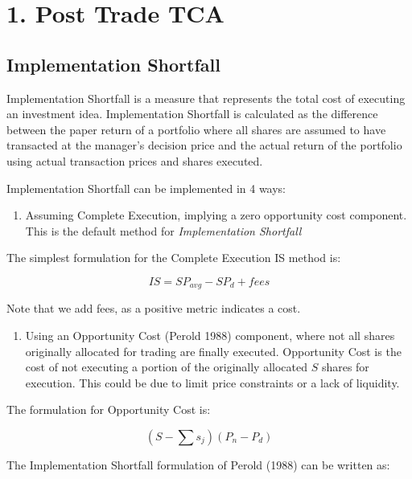 \hypertarget{post-trade-tca}{%
\section{1. Post Trade TCA}\label{post-trade-tca}}

\hypertarget{implementation-shortfall}{%
\subsection{Implementation Shortfall}\label{implementation-shortfall}}

Implementation Shortfall is a measure that represents the total cost of
executing an investment idea. Implementation Shortfall is calculated as
the difference between the paper return of a portfolio where all shares
are assumed to have transacted at the manager's decision price and the
actual return of the portfolio using actual transaction prices and
shares executed.

Implementation Shortfall can be implemented in 4 ways:

\begin{enumerate}
\def\labelenumi{\arabic{enumi}.}
\tightlist
\item
  Assuming Complete Execution, implying a zero opportunity cost
  component. This is the default method for
  \emph{Implementation Shortfall}
\end{enumerate}

The simplest formulation for the Complete Execution IS method is:

\[ IS = S P_{avg} - S P_{d} + fees \]

Note that we add fees, as a positive metric indicates a cost.

\begin{enumerate}
\def\labelenumi{\arabic{enumi}.}
\setcounter{enumi}{1}
\tightlist
\item
  Using an Opportunity Cost (Perold 1988) component, where not all
  shares originally allocated for trading are finally executed.
  Opportunity Cost is the cost of not executing a portion of the
  originally allocated \(S\) shares for execution. This could be due to
  limit price constraints or a lack of liquidity.
\end{enumerate}

The formulation for Opportunity Cost is:

\[ (S - \sum s_{j}) (P_{n} - P_{d}) \]

The Implementation Shortfall formulation of Perold (1988) can be written
as:

